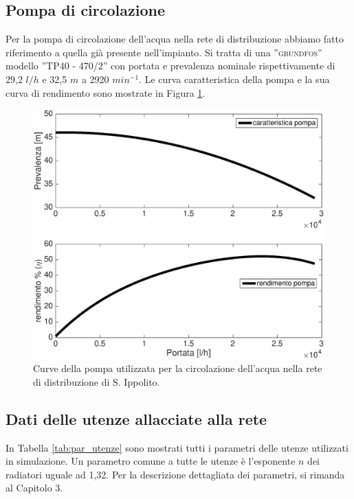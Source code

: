 \documentclass[laurea,oneside,11pt]{USiena_tesiLM3}
\begin{document}
\subsection{Pompa di circolazione}

Per la pompa di circolazione dell'acqua nella rete di distribuzione abbiamo fatto riferimento a quella già presente nell'impianto. Si tratta di una ''\textsc{grundfos}'' modello ''\textsc{TP40 - 470/2}'' con portata e prevalenza nominale rispettivamente di 29,2 $l/h$ e 32,5 $m$ a 2920 $min^{-1}$.
Le curva caratteristica della pompa e la sua curva di rendimento sono mostrate in Figura \ref{fig:curve_pompa}.

\begin{figure}[!ht]
\centering
\includegraphics[width=\textwidth]{figure/curve_pompa} 
\caption{Curve della pompa utilizzata per la circolazione dell'acqua nella rete di distribuzione di S. Ippolito. }
\label{fig:curve_pompa}
\end{figure}

\subsection{Dati delle utenze allacciate alla rete}
In Tabella \ref{tab:par_utenze} sono mostrati tutti i parametri delle utenze utilizzati in simulazione. Un parametro comune a tutte le utenze è l'esponente $n$ dei radiatori uguale ad 1,32.
Per la descrizione dettagliata dei parametri, si rimanda al Capitolo 3. 
\end{document}
